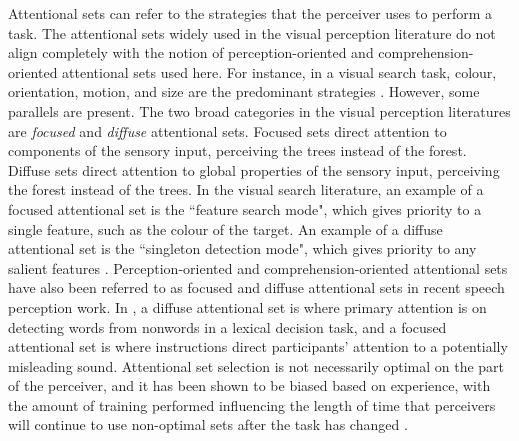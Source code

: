 Attentional sets can refer to the strategies that the perceiver uses to perform a task.
The attentional sets widely used in the visual perception literature do not align completely with the notion of perception-oriented and comprehension-oriented attentional sets used here.
For instance, in a visual search task, colour, orientation, motion, and size are the predominant strategies \citep{Wolfe2004}.
However, some parallels are present.
The two broad categories in the visual perception literatures are \emph{focused} and \emph{diffuse} attentional sets.
Focused sets direct attention to components of the sensory input, perceiving the trees instead of the forest. 
Diffuse sets direct attention to global properties of the sensory input, perceiving the forest instead of the trees.  
In the visual search literature, an example of a focused attentional set is the ``feature search mode", which gives priority to a single feature, such as the colour of the target. An example of a diffuse attentional set is the ``singleton detection mode", which gives priority to any salient features \citep{Bacon1994}.
Perception-oriented and comprehension-oriented attentional sets have also been referred to as focused and diffuse attentional sets in recent speech perception work.
In \citet{Pitt2012}, a diffuse attentional set is where primary attention is on detecting words from nonwords in a lexical decision task, and a focused attentional set is where instructions direct participants' attention to a potentially misleading sound.
Attentional set selection is not necessarily optimal on the part of the perceiver, and it has been shown to be biased based on experience, with the amount of training performed influencing the length of time that perceivers will continue to use non-optimal sets after the task has changed \citep{Leber2006}.

